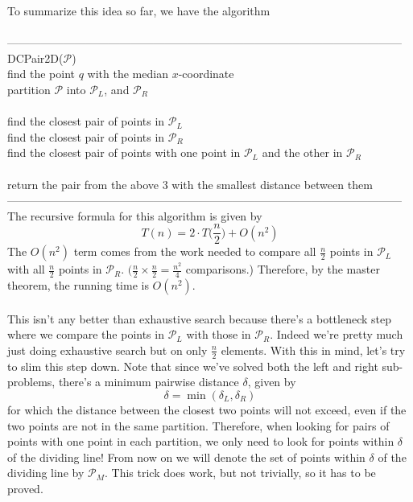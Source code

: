 \documentclass{article}
\newcommand{\x}{\cdot}
\newcommand{\de}{\delta}
\newcommand{\mcal}[1]{\mathcal{#1}}
\begin{document}
To summarize this idea so far, we have the algorithm\\\\
---------------------------------------------------------------------------------------------------------
DCPair2D($\mathcal{P}$)\\
	\hspace*{7mm} find the point $q$ with the median $x$-coordinate\\
	\hspace*{7mm} partition $\mcal{P}$ into $\mcal{P}_L$, and $\mcal{P}_R$\\\\
	\hspace*{7mm} find the closest pair of points in $\mcal{P}_L$\\
	\hspace*{7mm} find the closest pair of points in $\mcal{P}_R$\\
	\hspace*{7mm} find the closest pair of points with one point in $\mcal{P}_L$ and the other in $\mcal{P}_R$\\\\
	\hspace*{7mm} return the pair from the above 3 with the smallest distance between them\\
---------------------------------------------------------------------------------------------------------\\
The recursive formula for this algorithm is given by
\[T(n) = 2\x T\Big(\frac{n}{2}\Big) + O(n^2)\]
The $O(n^2)$ term comes from the work needed to compare all $\frac{n}{2}$ points in $\mcal{P}_L$ with all $\frac{n}{2}$ points in $\mcal{P}_R$. $\big(\frac{n}{2} \times \frac{n}{2} = \frac{n^2}{4}$ comparisons.\big) Therefore, by the master theorem, the running time is $O(n^2)$.\\\\
This isn't any better than exhaustive search because there's a bottleneck step where we compare the points in $\mcal{P}_L$ with those in $\mcal{P}_R$. Indeed we're pretty much just doing exhaustive search but on only $\frac{n}{2}$ elements. With this in mind, let's try to slim this step down. Note that since we've solved both the left and right sub-problems, there's a minimum pairwise distance $\de$, given by
\[\de = \min(\de_L, \de_R)\]
for which the distance between the closest two points will not exceed, even if the two points are not in the same partition. Therefore, when looking for pairs of points with one point in each partition, we only need to look for points within $\de$ of the dividing line! From now on we will denote the set of points within $\de$ of the dividing line by $\mcal{P}_M$. This trick does work, but not trivially, so it has to be proved.\\\\
\end{document}

